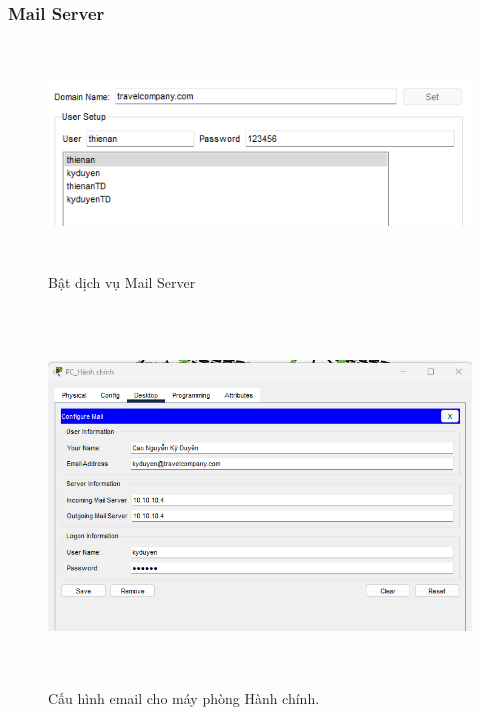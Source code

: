 \documentclass[a4paper, 12pt]{article}
\begin{document}
\subsubsection{Mail Server}
\begin{figure}[H]
    \centering
    \includegraphics[width=16cm, height=6cm]{img/4.2.2a.png}
    \caption{Bật dịch vụ Mail Server}
    \label{hinh422a}
\end{figure}
\begin{figure}[H]
    \centering
    \includegraphics[width=16cm, height=10cm]{img/4.2.2b.png}
    \caption{Cấu hình email cho máy phòng Hành chính.}
    \label{hinh422b}
\end{figure}
\end{document}
